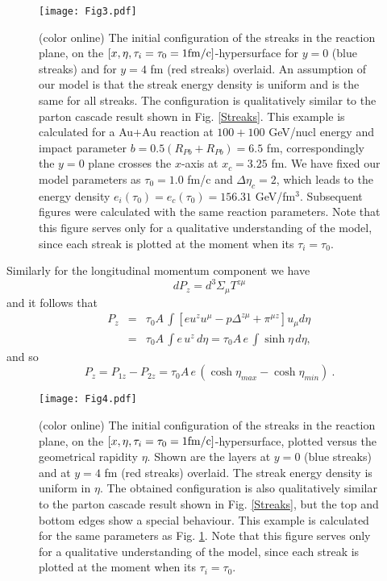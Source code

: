 \documentclass[aps,prc,twocolumn,floatfix,showpacs,a4paper,
nofootinbib,amsmath,amssymb]{revtex4-1}
\newcommand{\be}{\begin{equation}}
\newcommand{\ee}{\end{equation}}
\newcommand{\ba}{\begin{eqnarray}}
\newcommand{\ea}{\end{eqnarray}}
\begin{document}
%
\begin{figure}[htb]     %
\begin{center}
\resizebox{1.01\columnwidth}{!}
{\texttt{[image: Fig3.pdf]}}
\caption{ (color online)
The initial configuration of the streaks in the reaction plane, 
on the $[x,\eta, \tau_i=\tau_0=1{\rm fm/c}]$-hypersurface for $y=0$
(blue streaks) and for $y=4$ fm (red streaks) overlaid.
An assumption of our model is that the streak energy density is uniform and is the same for all streaks.
The configuration is qualitatively similar to the parton cascade result
shown in Fig. \ref{Streaks}. This example is calculated for a
Au+Au reaction at $100+100$ GeV/nucl energy and impact parameter
$b= 0.5 (R_{Pb} + R_{Pb}) = 6.5$ fm, correspondingly the $y=0$ plane crosses the $x$-axis at $x_c=3.25$ fm. 
We have fixed our model parameters as $\tau_0 = 1.0$ fm/c and $\Delta \eta_c = 2$, 
which leads to the energy density $e_i(\tau_0)=e_c(\tau_0)  = 156.31$ GeV/fm$^3$. 
Subsequent figures were calculated with the same reaction
parameters.  Note that this figure serves only for a qualitative 
understanding of the model, since each streak is plotted at the moment when its $\tau_i=\tau_0$.
}
\label{Config-in-xz}
\end{center}
\end{figure}  %
%



Similarly for the longitudinal momentum component we have 
\be
d P_z =  d^3\Sigma_\mu T^{z\mu}
\ee
and it follows that
\ba \nonumber
P_z &=& \tau_0 A\, \int [e u^z u^\mu  - p \Delta^{z\mu} + \pi^{\mu z}]
u_\mu d\eta \\
&=& \tau_0 A\, \int e\, u^z\, d\eta = 
\tau_0 A\, e\, \int \sinh \eta\, d\eta,
\label{Pzeta}
\ea
and so 
\be
P_{z} = 
P_{1z} - P_{2z} = \tau_0 A\, e\, (\cosh \eta_{max} - \cosh \eta_{min})\ .
\label{P13}
\ee


%
\begin{figure}[htb]     %
\begin{center}
\resizebox{0.94\columnwidth}{!}
{\texttt{[image: Fig4.pdf]}}
\caption{ (color online)
The initial configuration of the streaks in the reaction plane, 
on the $[x,\eta, \tau_i=\tau_0=1{\rm fm/c}]$-hypersurface,
plotted versus the geometrical rapidity $\eta$.
Shown are the layers at $y=0$ (blue streaks) and at 
$y=4$ fm (red streaks) overlaid.
The streak energy density is uniform in $\eta$.
The obtained configuration is also qualitatively similar to the parton cascade 
result shown in Fig. \ref{Streaks}, but the top and bottom
edges show a special behaviour. This example is calculated for the
same parameters as Fig. \ref{Config-in-xz}. Note that this figure serves only for a qualitative  understanding of the model, since each streak is plotted at the moment when its $\tau_i=\tau_0$.
}
\label{Config-in-xeta}
\end{center}
\end{figure}  %
%
\end{document}
